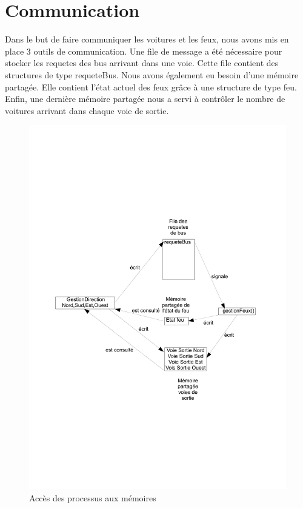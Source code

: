 \section{Communication}
Dans le but de faire communiquer les voitures et les feux, nous avons mis en place 3 outils de communication. Une file de message a été nécessaire pour stocker les requetes des bus arrivant dans une voie. Cette file contient des structures de type requeteBus. Nous avons également eu besoin d'une mémoire partagée. Elle contient l'état actuel des feux grâce à une structure de type feu. Enfin, une dernière mémoire partagée nous a servi à contrôler le nombre de voitures arrivant dans chaque voie de sortie.
\newpage
\begin{figure}[htb!]
\centering
\includegraphics[scale=0.5]{graphe1LO41.pdf}

\caption{Accès des processus aux mémoires}
\end{figure}
